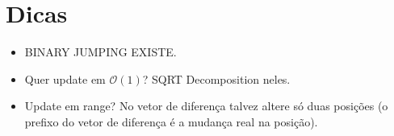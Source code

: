 \section{Dicas}
\begin{itemize}
    \item BINARY JUMPING EXISTE.
    \item Quer update em $\mathcal{O}(1)$? SQRT Decomposition neles.
    \item Update em range? No vetor de diferença talvez altere só duas posições (o prefixo do vetor de diferença é a mudança real na posição).
\end{itemize}
